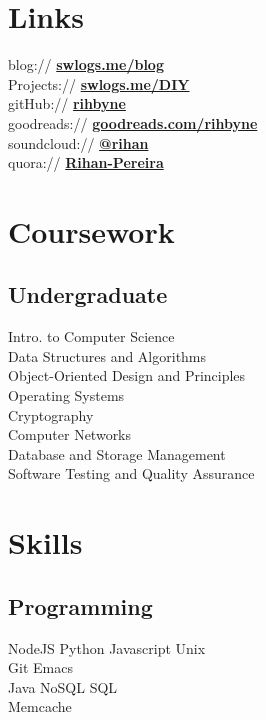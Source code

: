 \documentclass[]{deedy-resume-openfont}
\begin{document}
\begin{minipage}[t]{0.33\textwidth}
\section{Links}
blog:// \href{http://swlogs.me/blog}{\bf swlogs.me/blog} \\
Projects:// \href{http://swlogs.me/DIY}{\bf swlogs.me/DIY} \\
gitHub:// \href{https://github.com/rihbyne}{\bf rihbyne} \\
goodreads://  \href{https://goodreads.com/rihbyne}{\bf goodreads.com/rihbyne} \\ 
soundcloud:// \href{http://www.soundcloud.com/rihbyne}{\bf @rihan} \\
quora://  \href{https://www.quora.com/Rihan-Pereira}{\bf Rihan-Pereira}


\section{Coursework}
\subsection{Undergraduate}
Intro. to Computer Science\\
Data Structures and Algorithms\\ 
Object-Oriented Design and Principles\\
Operating Systems\\
Cryptography \\
Computer Networks \\
Database and Storage Management \\
Software Testing and Quality Assurance
\sectionsep


\section{Skills}
\subsection{Programming}
NodeJS \textbullet{} Python \textbullet{} Javascript \textbullet{} Unix \\
Git \textbullet{} Emacs \\
Java \textbullet{} NoSQL \textbullet{} SQL \\
Memcache 
\sectionsep


\end{minipage}
\end{document}
